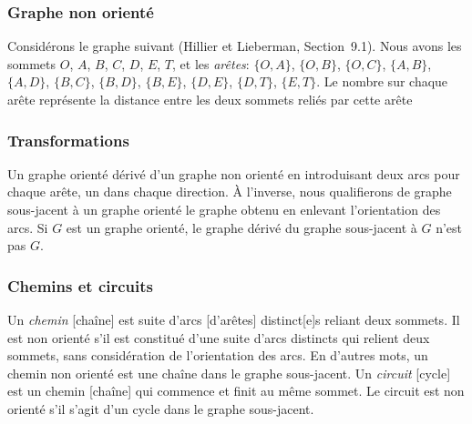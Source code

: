 \documentclass[usepdftitle=false]{beamer}
\begin{document}
\begin{frame}[fragile]
\frametitle{Graphe non orienté}

Considérons le graphe suivant (Hillier et Lieberman, Section~9.1).
Nous avons les sommets $O$, $A$, $B$, $C$, $D$, $E$, $T$, et les {\sl arêtes}: $\lbrace O,A \rbrace$, $\lbrace O,B \rbrace$, $\lbrace O,C \rbrace$, $\lbrace A,B \rbrace$, $\lbrace A,D \rbrace$, $\lbrace B,C \rbrace$,
$\lbrace B,D \rbrace$, $\lbrace B,E \rbrace$, $\lbrace D,E \rbrace$, $\lbrace D,T \rbrace$, $\lbrace E,T \rbrace$.
Le nombre sur chaque arête représente la distance entre les deux sommets reliés par cette arête

\begin{center}
\end{center}

\end{frame}

\begin{frame}[fragile]
\frametitle{Transformations}

Un graphe orienté dérivé d'un graphe non orienté en introduisant deux arcs pour chaque arête, un dans chaque direction.
\`A l'inverse, nous qualifierons de graphe sous-jacent à un graphe orienté le graphe obtenu en enlevant l'orientation des arcs.
Si $G$ est un graphe orienté, le graphe dérivé du graphe sous-jacent à $G$ n'est pas $G$.

\end{frame}

\begin{frame}
\frametitle{Chemins et circuits}

Un {\sl chemin} [chaîne] est suite d'arcs [d'arêtes] distinct[e]s reliant deux sommets.
Il est non orienté s'il est constitué d'une suite d'arcs distincts qui relient deux sommets, sans considération de l'orientation des arcs.
En d'autres mots, un chemin non orienté est une chaîne dans le graphe sous-jacent.
Un {\sl circuit} [cycle] est un chemin [chaîne] qui commence et finit au même sommet.
Le circuit est non orienté s'il s'agit d'un cycle dans le graphe sous-jacent.

\end{frame}
\end{document}

